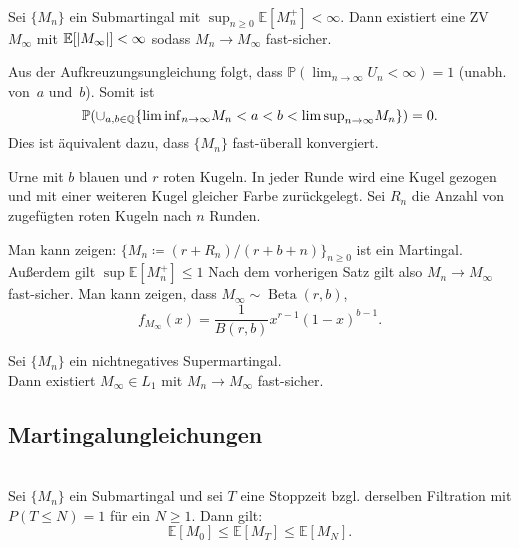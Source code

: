 \documentclass{cheat-sheet}
\renewcommand{\P}{\mathbb{P}} %
\newcommand{\E}{\mathbb{E}} %
\DeclareMathOperator{\Beta}{Beta} %
\begin{document}
\begin{satz} \mbox{}\\
  Sei $\{ M_n \}$ ein Submartingal mit ${\sup}_{n \geq 0} \E [ M_n^{+} ] < \infty$.
  Dann existiert eine ZV $M_\infty$ mit $\E[ \abs{M_\infty} ] < \infty$ sodass $M_n \to M_\infty$ fast-sicher.
\end{satz}

\begin{beweisskizze}
  Aus der Aufkreuzungsungleichung folgt, dass $\P({\lim}_{n \to \infty} U_n < \infty) = 1$ (unabh. von~$a$ und~$b$).
  Somit ist
  \[ \P({\cup}_{a, b \in \Q} \{ {\liminf}_{n \to \infty} M_n < a < b < {\limsup}_{n \to \infty} M_n \}) = 0. \]
  Dies ist äquivalent dazu, dass $\{ M_n \}$ fast-überall konvergiert.
\end{beweisskizze}

\begin{bsp}
  Urne mit $b$ blauen und $r$ roten Kugeln.
  In jeder Runde wird eine Kugel gezogen und mit einer weiteren Kugel gleicher Farbe zurückgelegt.
  Sei $R_n$ die Anzahl von zugefügten roten Kugeln nach $n$ Runden.

  Man kann zeigen: $\{ M_n \coloneqq (r + R_n) / (r + b + n) \}_{n \geq 0}$ ist ein Martingal.
  Außerdem gilt $\sup \E[M_n^{+}] \leq 1$
  Nach dem vorherigen Satz gilt also $M_n \to M_\infty$ fast-sicher.
  Man kann zeigen, dass $M_\infty \sim \Beta(r, b)$,
  \[
    f_{M_\infty}(x) = \frac{1}{B(r, b)} x^{r-1} (1-x)^{b-1}.
  \]
\end{bsp}

\begin{kor}
  Sei $\{ M_n \}$ ein nichtnegatives Supermartingal. \\
  Dann existiert $M_\infty \in L_1$ mit $M_n \to M_\infty$ fast-sicher.
\end{kor}


\subsection{Martingalungleichungen}

\begin{satz} \mbox{}\\
  Sei $\{ M_n \}$ ein Submartingal und sei $T$ eine Stoppzeit bzgl. derselben Filtration mit $P(T \leq N) = 1$ für ein $N \geq 1$.
  Dann gilt:
  \[
    \E[M_0] \leq \E[M_T] \leq \E[M_N].
  \]
\end{satz}
\end{document}

